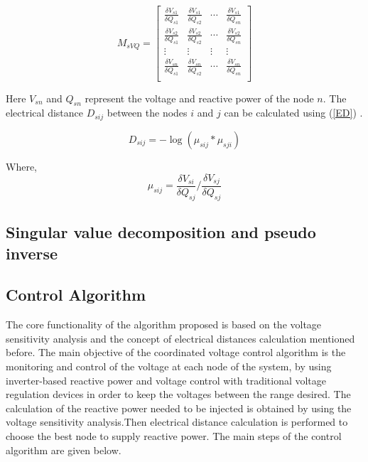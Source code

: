 \begin{equation}\label{MsVq_expan}
M_{sVQ} =
\begin{bmatrix}
\frac{\delta V_{s1}}{\delta Q_{s1}}  & \frac{\delta V_{s1}}{\delta Q_{s2}} & \cdots & \frac{\delta V_{s1}}{\delta Q_{sn}}\\

\frac{\delta V_{s2}}{\delta Q_{s1}}  & \frac{\delta V_{s2}}{\delta Q_{s2}} & \cdots & \frac{\delta V_{s2}}{\delta Q_{sn}}\\

\vdots & \vdots & \vdots & \vdots\\

\frac{\delta V_{sn}}{\delta Q_{s1}}  & \frac{\delta V_{sn}}{\delta Q_{s2}} & \cdots & \frac{\delta V_{sn}}{\delta Q_{sn}}\\ 
\end{bmatrix}
\end{equation}
 
Here $V_{sn}$ and $Q_{sn}$ represent the voltage and reactive power of the node $n$. The electrical distance $D_{sij}$ between the nodes $i$ and $j$ can be calculated using (\ref{ED}) \cite{int1}. 

\begin{equation}\label{ED}
D_{sij} = -\log (\mu_{sij} * \mu_{sji})
\end{equation}

Where,
\begin{equation}
\mu_{sij} =  \frac{\delta V_{si}}{\delta Q_{sj}} / \frac{\delta V_{sj}}{\delta Q_{sj}}
\end{equation}


\subsection{Singular value decomposition and pseudo inverse}


\subsection{Control Algorithm}
The core functionality of the algorithm proposed is based on the voltage sensitivity analysis and the concept of electrical distances calculation mentioned before. The main objective of the coordinated voltage control algorithm is the monitoring and control of the voltage at each node of the system, by using inverter-based reactive power and voltage control with traditional voltage regulation devices in order to keep the voltages between the range desired. The calculation of the reactive power needed to be injected is obtained by using the voltage sensitivity analysis.Then electrical distance calculation is performed to choose the best node to supply reactive power. The main steps of the control algorithm are given below.

